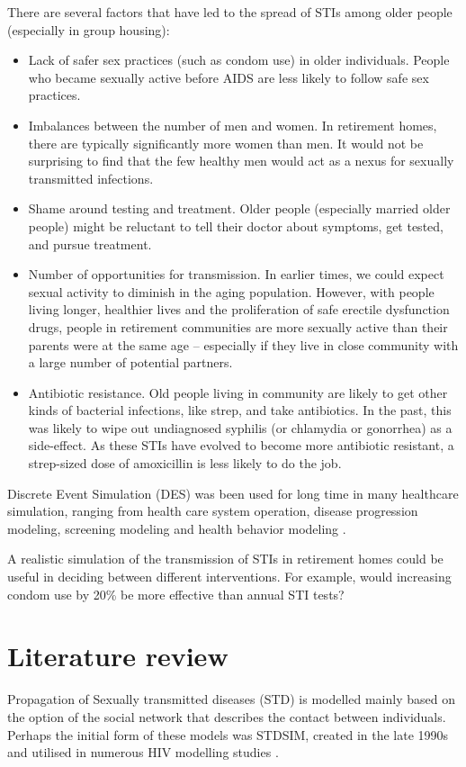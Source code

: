 \documentclass{article}
\begin{document}
\begin{normalsize}
    There are several factors that have led to the spread of STIs among older people (especially in group housing):
    \begin{itemize}
	\item Lack of safer sex practices (such as condom use) in older individuals. People who became sexually active before AIDS are less likely to follow safe sex practices.
    \item Imbalances between the number of men and women. In retirement homes, there are typically significantly more women than men. It would not be surprising to find that the few healthy men would act as a nexus for sexually transmitted infections.
    \item Shame around testing and treatment. Older people (especially married older people) might be reluctant to tell their doctor about symptoms, get tested, and pursue treatment.
    \item Number of opportunities for transmission. In earlier times, we could expect sexual activity to diminish in the aging population.  However, with people living longer, healthier lives and the proliferation of safe erectile dysfunction drugs, people in retirement communities are more sexually active than their parents were at the same age -- especially if they live in close community with a large number of potential partners.
    \item Antibiotic resistance. Old people living in community are likely to get other kinds of bacterial infections, like strep, and take antibiotics. In the past, this was likely to wipe out undiagnosed syphilis (or chlamydia or gonorrhea) as a side-effect. As these STIs have evolved to become more antibiotic resistant, a strep-sized dose of amoxicillin is less likely to do the job.
    \end{itemize}
    
    Discrete Event Simulation (DES) was been used for long time in many healthcare simulation, ranging from health care system operation, disease progression modeling, screening modeling and health behavior modeling \cite{lebcir2017, Zhang2018}. 
    
    
     A realistic simulation of the transmission of STIs in retirement homes could be useful in deciding between different interventions.  For example, would increasing condom use by 20\% be more effective than annual STI tests?
       
     \section{Literature review}
     Propagation of Sexually transmitted diseases (STD) is modelled mainly based on the option of the social network that describes the contact between individuals. Perhaps the initial form of these models was STDSIM, created in the late 1990s and utilised in numerous HIV modelling studies \cite{10.2307/25062378}.
     

\end{normalsize}
\end{document}
